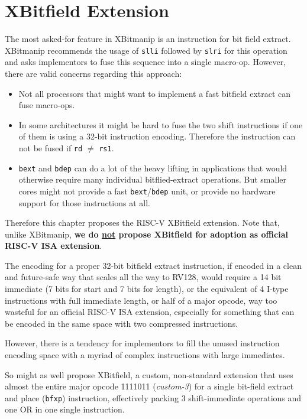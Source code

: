 \chapter{XBitfield Extension}
\label{bfxp}

The most asked-for feature in XBitmanip is an instruction for bit field
extract. XBitmanip recommends the usage of {\tt slli} followed by {\tt slri}
for this operation and asks implementors to fuse this sequence into a single
macro-op. However, there are valid concerns regarding this approach:

\begin{itemize}
\item Not all processors that might want to implement a fast bitfield extract
can fuse macro-ops.
\item In some architectures it might be hard to fuse the two shift instructions
if one of them is using a 32-bit instruction encoding. Therefore the instruction
can not be fused if {\tt rd} $\ne$ {\tt rs1}.
\item {\tt bext} and {\tt bdep} can do a lot of the heavy lifting in applications that
would otherwise require many individual bitflied-extract operations. But smaller cores might not provide
a fast {\tt bext}/{\tt bdep} unit, or provide no hardware support for those instructions at all.
\end{itemize}

Therefore this chapter proposes the RISC-V XBitfield extension. Note that, unlike
XBitmanip, {\bf we do \underline{not} propose XBitfield for adoption as official RISC-V ISA extension}.

The encoding for a proper 32-bit bitfield extract instruction, if encoded
in a clean and future-safe way that scales all the way to RV128, would require
a 14 bit immediate (7 bits for start and 7 bits for length), or the equivalent
of 4 I-type instructions with full immediate length, or half of a major opcode,
way too wasteful for an official RISC-V ISA extension, especially for something
that can be encoded in the same space with two compressed instructions.

However, there is a tendency for implementors to fill the unused instruction
encoding space with a myriad of complex instructions with large immediates.~\cite{Ri5cy}

So might as well propose XBitfield, a custom, non-standard extension that uses
almost the entire major opcode 1111011 ({\it custom-3}) for a single bit-field
extract and place ({\tt bfxp}) instruction, effectively packing 3
shift-immediate operations and one OR in one single instruction.

